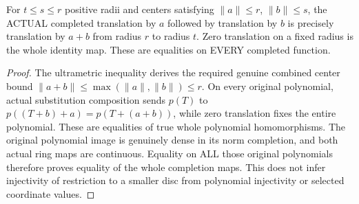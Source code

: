 \begin{theorem}
\label{analytic:actual-gauss-disc-restriction-composition}
\leanok
For $t\leq s\leq r$ positive radii and centers satisfying
$\|a\|\leq r$, $\|b\|\leq s$, the ACTUAL completed
translation by $a$ followed by translation by $b$ is precisely
translation by $a+b$ from radius $r$ to radius $t$.
Zero translation on a fixed radius is the whole identity map.
These are equalities on EVERY completed function.
\end{theorem}
\begin{proof}
The ultrametric inequality derives the required genuine combined
center bound $\|a+b\|\leq\max(\|a\|,\|b\|)\leq r$.
On every original polynomial, actual substitution composition
sends $p(T)$ to $p((T+b)+a)=p(T+(a+b))$, while zero
translation fixes the entire polynomial. These are equalities
of true whole polynomial homomorphisms. The original polynomial
image is genuinely dense in its norm completion, and both actual
ring maps are continuous. Equality on ALL those original
polynomials therefore proves equality of the whole completion
maps. This does not infer injectivity of restriction to a smaller
disc from polynomial injectivity or selected coordinate values.
\end{proof}

